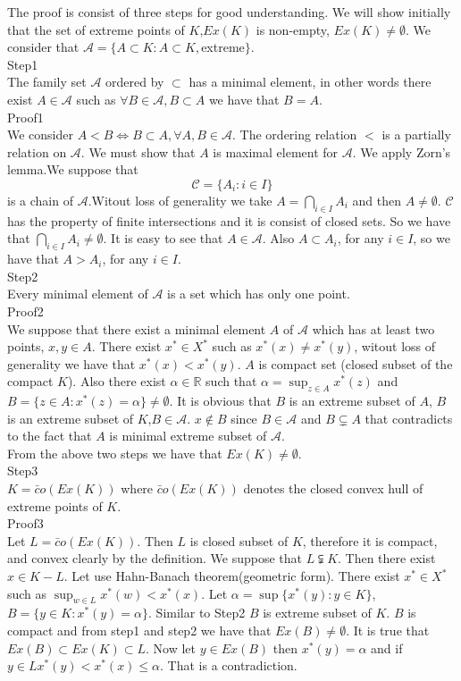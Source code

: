 \documentclass[12pt]{article}
\begin{document}
The proof is consist of three steps for good understanding.
We will show initially that the set of extreme points of $K$,$Ex(K)$ is non-empty, $Ex(K)\neq \emptyset $.
We consider that $\mathcal{A}=\{A\subset K\colon A \subset K , $extreme$ \}$.
\\Step1
\\The family set $\mathcal{A}$ ordered by $\subset $ has a minimal element, in other words there exist $A \in  \mathcal{A}$ 
such as $\forall B\in \mathcal{A},B\subset A$ we have that $B=A$.
\\Proof1\\ We consider $A<B \Leftrightarrow B\subset A, \forall A,B \in  \mathcal{A}$. The ordering relation $<$ is a partially relation
on $\mathcal{A}$. We must show that $A$ is maximal element for $\mathcal{A}$.
We apply Zorn's lemma.We suppose that $$\mathcal{C}=\{A_i\colon i\in I\}$$ is a chain of $\mathcal{A}$.Witout loss of
generality we take $A=\bigcap_{i\in I} A_i$ and then $A\neq \emptyset$. $\mathcal{C}$ has the property of finite intersections
and it is consist of closed sets. So we have that $\bigcap_{i\in I}A_i\neq \emptyset$. It is easy to see that $A\in  \mathcal{A}$.
 Also $A\subset A_i$, for any $i\in I$, so we have that $A>A_i$, for any $i\in I$.
\\Step2
\\ Every minimal element of  $\mathcal{A}$ is a set which has only one point.
\\Proof2
\\We suppose that there exist a minimal element $A$ of  $\mathcal{A}$ which has at least two points, 
$x,y \in A$. There exist $x^* \in X^*$ such as $x^*(x)\neq x^*(y)$, witout loss of
generality we have that $x^*(x)<x^*(y)$. $A$ is compact set (closed subset of the compact $K$). Also there 
exist $\alpha \in \mathbb{R}$ such that $\alpha=\sup_{z\in A}x^*(z)$ and $B=\{z\in A\colon x^*(z)=\alpha\}\neq \emptyset$.
It is obvious that $B$ is an extreme subset of $A$, $B$ is an extreme subset of $K$,$B \in \mathcal{A}$.
$x\notin B$ since $B\in \mathcal{A}$ and $B \subsetneq A$ that contradicts to the fact that $A$ is minimal extreme subset of $\mathcal{A}$.
\\From the above two steps we have that $Ex(K)\neq \emptyset$.
\\Step3 
\\$K=\bar co(Ex(K))$ where $\bar co(Ex(K))$ denotes the closed convex hull of extreme points of $K$.
\\Proof3 
\\Let $L=\bar co(Ex(K))$. Then $L$ is closed subset of $K$, therefore it is compact, and convex clearly by the definition.
We suppose that $L\subsetneqq K$. Then there exist $x\in K-L$. Let use Hahn-Banach theorem(geometric form).
There exist $x^* \in X^*$ such as $\sup_{w\in L}x^*(w)<x^*(x)$. Let $\alpha=\sup\{x^*(y)\colon y\in K\}$, $B=\{y\in K\colon x^*(y)=\alpha\}$. Similar to
Step2 $B$ is extreme subset of $K$. $B$ is compact and from step1 and step2 we have that $Ex(B)\neq \emptyset$. It is true that 
$Ex(B)\subset Ex(K)\subset L$. Now let $y \in Ex(B)$ then $x^*(y)=\alpha$ and if $y \in L x^*(y)<x^*(x)\leq \alpha $. That is a contradiction.
\end{document}
